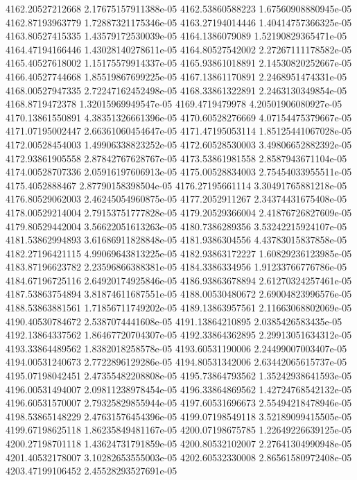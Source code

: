 {4162.20527212668 2.17675157911388e-05
4162.53860588223 1.67560908880945e-05
4162.87193963779 1.72887321175346e-05
4163.27194014446 1.40414757366325e-05
4163.80527415335 1.43579172530039e-05
4164.1386079089 1.52190829365471e-05
4164.47194166446 1.43028140278611e-05
4164.80527542002 2.27267111178582e-05
4165.40527618002 1.15175579914337e-05
4165.93861018891 2.14530820252667e-05
4166.40527744668 1.85519867699225e-05
4167.13861170891 2.2468951474331e-05
4168.00527947335 2.72247162452498e-05
4168.33861322891 2.2463130349854e-05
4168.8719472378 1.32015969949547e-05
4169.4719479978 4.20501906080927e-05
4170.13861550891 4.38351326661396e-05
4170.60528276669 4.07154475379667e-05
4171.07195002447 2.66361060454647e-05
4171.47195053114 1.85125441067028e-05
4172.00528454003 1.49906338823252e-05
4172.60528530003 3.49806652882392e-05
4172.93861905558 2.87842767628767e-05
4173.53861981558 2.8587943671104e-05
4174.00528707336 2.05916197606913e-05
4175.00528834003 2.75454033955511e-05
4175.4052888467 2.87790158398504e-05
4176.27195661114 3.30491765881218e-05
4176.80529062003 2.46245054960875e-05
4177.2052911267 2.34374431675408e-05
4178.00529214004 2.79153751777828e-05
4179.20529366004 2.41876726827609e-05
4179.80529442004 3.56622051613263e-05
4180.7386289356 3.53242215924107e-05
4181.53862994893 3.61686911828848e-05
4181.9386304556 4.43783015837858e-05
4182.27196421115 4.99069643813225e-05
4182.93863172227 1.60829236123985e-05
4183.87196623782 2.23596866388381e-05
4184.3386334956 1.91233766776786e-05
4184.67196725116 2.64920174925846e-05
4186.93863678894 2.61270324257461e-05
4187.53863754894 3.81874611687551e-05
4188.00530480672 2.69004823996576e-05
4188.53863881561 1.71856711749202e-05
4189.13863957561 2.11663068802069e-05
4190.40530784672 2.5387074441608e-05
4191.13864210895 2.0385426583435e-05
4192.13864337562 1.86467720704307e-05
4192.33864362895 2.29913051634312e-05
4193.33864489562 1.8382018258578e-05
4193.60531190006 2.24499007003407e-05
4194.00531240673 2.7722896129286e-05
4194.80531342006 2.63442065615737e-05
4195.07198042451 2.47355482208808e-05
4195.73864793562 1.35242938641593e-05
4196.00531494007 2.09811238978454e-05
4196.33864869562 1.42724768542132e-05
4196.60531570007 2.79325829855944e-05
4197.60531696673 2.55494218478946e-05
4198.53865148229 2.47631576454396e-05
4199.07198549118 3.52189099415505e-05
4199.67198625118 1.86235849481167e-05
4200.07198675785 1.22649226639125e-05
4200.27198701118 1.43624731791859e-05
4200.80532102007 2.27641304990948e-05
4201.40532178007 3.10282653555003e-05
4202.60532330008 2.86561580972408e-05
4203.47199106452 2.45528293527691e-05
}
